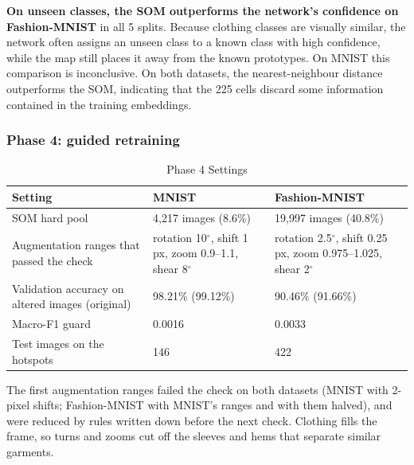 \documentclass{scrartcl}
\begin{document}
\textbf{On unseen classes, the SOM outperforms the network's confidence on Fashion-MNIST} in all 5 splits. Because clothing classes are visually similar, the network often assigns an unseen class to a known class with high confidence, while the map still places it away from the known prototypes. On MNIST this comparison is inconclusive. On both datasets, the nearest-neighbour distance outperforms the SOM, indicating that the 225 cells discard some information contained in the training embeddings.

\subsubsection*{Phase 4: guided retraining}

\begin{table}[H]
\centering
\caption{Phase 4 Settings}
\label{tab:p4settings}
\renewcommand{\arraystretch}{1.12}
\footnotesize
\begin{tabular}{|L{0.36\textwidth}|C{0.25\textwidth}|C{0.25\textwidth}|}
\hline
\textbf{Setting} & \textbf{MNIST} & \textbf{Fashion-MNIST} \\ \hline
SOM hard pool & 4,217 images (8.6\%) & 19,997 images (40.8\%) \\ \hline
Augmentation ranges that passed the check & rotation 10$^\circ$, shift 1 px, zoom 0.9--1.1, shear 8$^\circ$ & rotation 2.5$^\circ$, shift 0.25 px, zoom 0.975--1.025, shear 2$^\circ$ \\ \hline
Validation accuracy on altered images (original) & 98.21\% (99.12\%) & 90.46\% (91.66\%) \\ \hline
Macro-F1 guard & 0.0016 & 0.0033 \\ \hline
Test images on the hotspots & 146 & 422 \\ \hline
\end{tabular}

\par\vspace{3pt}
{\footnotesize\raggedright\noindent The first augmentation ranges failed the check on both datasets (MNIST with 2-pixel shifts; Fashion-MNIST with MNIST's ranges and with them halved), and were reduced by rules written down before the next check. Clothing fills the frame, so turns and zooms cut off the sleeves and hems that separate similar garments.\par}
\end{table}
\end{document}
